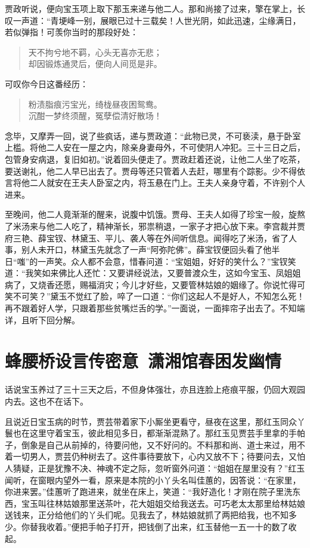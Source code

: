 \documentclass[12pt,oneside]{book}
\newenvironment{shici}{%
\begin{verse}%
\centering\large\hspace{12pt}}%
{\end{verse}}
\begin{document}
贾政听说，便向宝玉项上取下那玉来递与他二人。那和尚接了过来，擎在掌上，长叹一声道：“青埂峰一别，展眼已过十三载矣！人世光阴，如此迅速，尘缘满日，若似弹指！可羡你当时的那段好处：

\begin{shici}
天不拘兮地不羁，心头无喜亦无悲；\\
却因锻炼通灵后，便向人间觅是非。
\end{shici}

可叹你今日这番经历：

\begin{shici}
粉渍脂痕污宝光，绮栊昼夜困鸳鸯。\\
沉酣一梦终须醒，冤孽偿清好散场！
\end{shici}


念毕，又摩弄一回，说了些疯话，递与贾政道：“此物已灵，不可亵渎，悬于卧室上槛。将他二人安在一屋之内，除亲身妻母外，不可使阴人冲犯。三十三日之后，包管身安病退，复旧如初。”说着回头便走了。贾政赶着还说，让他二人坐了吃茶，要送谢礼，他二人早已出去了。贾母等还只管着人去赶，哪里有个踪影。少不得依言将他二人就安在王夫人卧室之内，将玉悬在门上。王夫人亲身守着，不许别个人进来。

至晚间，他二人竟渐渐的醒来，说腹中饥饿。贾母、王夫人如得了珍宝一般，旋熬了米汤来与他二人吃了，精神渐长，邪祟稍退，一家子才把心放下来。李宫裁并贾府三艳、薛宝钗、林黛玉、平儿、袭人等在外间听信息。闻得吃了米汤，省了人事，别人未开口，林黛玉先就念了一声“阿弥陀佛”。薛宝钗便回头看了他半日“嗤”的一声笑。众人都不会意，惜春问道：“宝姐姐，好好的笑什么？”宝钗笑道：“我笑如来佛比人还忙：又要讲经说法，又要普渡众生，这如今宝玉、凤姐姐病了，又烧香还愿，赐福消灾；今儿才好些，又要管林姑娘的姻缘了。你说忙得可笑不可笑？”黛玉不觉红了脸，啐了一口道：“你们这起人不是好人，不知怎么死！再不跟着好人学，只跟着那些贫嘴烂舌的学。”一面说，一面摔帘子出去了。不知端详，且听下回分解。
 

\chapter{蜂腰桥设言传密意~潇湘馆春困发幽情}
话说宝玉养过了三十三天之后，不但身体强壮，亦且连脸上疮痕平服，仍回大观园内去。这也不在话下。

且说近日宝玉病的时节，贾芸带着家下小厮坐更看守，昼夜在这里，那红玉同众丫鬟也在这里守着宝玉，彼此相见多日，都渐渐混熟了。那红玉见贾芸手里拿的手帕子，倒象是自己从前掉的，待要问他，又不好问的。不料那和尚、道士来过，用不着一切男人，贾芸仍种树去了。这件事待要放下，心内又放不下；待要问去，又怕人猜疑，正是犹豫不决、神魂不定之际，忽听窗外问道：“姐姐在屋里没有？”红玉闻听，在窗眼内望外一看，原来是本院的小丫头名叫佳蕙的，因答说：“在家里，你进来罢。”佳蕙听了跑进来，就坐在床上，笑道：“我好造化！才刚在院子里洗东西，宝玉叫往林姑娘那里送茶叶，花大姐姐交给我送去。可巧老太太那里给林姑娘送钱来，正分给他们的丫头们呢。见我去了，林姑娘就抓了两把给我，也不知多少。你替我收着。”便把手帕子打开，把钱倒了出来，红玉替他一五一十的数了收起。
\end{document}
